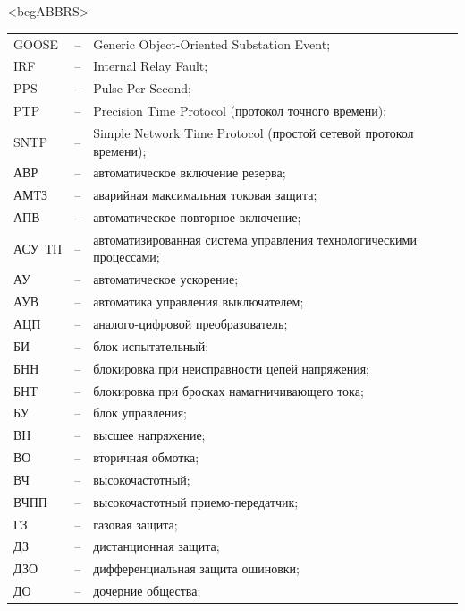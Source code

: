 \color{unidarkgreen}\section*{}
{\color{white}\fontsize{0.1pt}{0.1pt}\selectfont<begABBRS>}
\color{black}
\begin{longtable}{>{\raggedright\arraybackslash}m{2cm}>{\raggedright\arraybackslash}m{0.5cm}>{\raggedright\arraybackslash}m{20cm}}
\endfirsthead\endhead\endfoot\endlastfoot
GOOSE & -- & Generic Object-Oriented Substation Event; \\
IRF & -- & Internal Relay Fault; \\
PPS & -- & Pulse Per Second; \\
PTP & -- & Precision Time Protocol (протокол точного времени); \\
SNTP & -- & Simple Network Time Protocol (простой сетевой протокол времени); \\
АВР & -- & автоматическое включение резерва; \\
АМТЗ & -- & аварийная максимальная токовая защита; \\
АПВ & -- & автоматическое повторное включение; \\
АСУ~ТП & -- & автоматизированная система управления технологическими процессами; \\
АУ & -- & автоматическое ускорение; \\
АУВ & -- & автоматика управления выключателем; \\
АЦП & -- & аналого-цифровой преобразователь; \\
БИ & -- & блок испытательный; \\
БНН & -- & блокировка при неисправности цепей напряжения; \\
БНТ & -- & блокировка при бросках намагничивающего тока; \\
БУ & -- & блок управления; \\
ВН & -- & высшее напряжение; \\
ВО & -- & вторичная обмотка; \\
ВЧ & -- & высокочастотный; \\
ВЧПП & -- & высокочастотный приемо-передатчик; \\
ГЗ & -- & газовая защита; \\
ДЗ & -- & дистанционная защита; \\
ДЗО & -- & дифференциальная защита ошиновки; \\
ДО & -- & дочерние общества; \\

\end{longtable}
